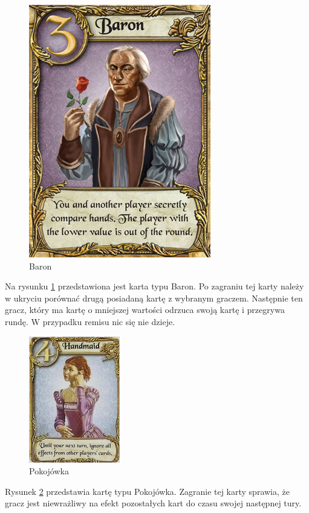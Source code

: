 \clearpage
\begin{figure}[h]
	\centering
	\includegraphics[scale=0.5]{Resources/Love_Letter_Card_Baron.png}
	\caption{Baron} \label{fig:Love_Letter_Card_Baron}
\end{figure}
Na rysunku \ref{fig:Love_Letter_Card_Baron} przedstawiona jest karta typu Baron. Po zagraniu tej karty należy w ukryciu porównać drugą posiadaną kartę z wybranym graczem. Następnie ten gracz, który ma kartę o mniejszej wartości odrzuca swoją kartę i przegrywa rundę. W przypadku remisu nic się nie dzieje.

\begin{figure}[h]
	\centering
	\includegraphics{Resources/Love_Letter_Card_Handmaid.png}
	\caption{Pokojówka} \label{fig:Love_Letter_Card_Handmaid}
\end{figure}
Rysunek \ref{fig:Love_Letter_Card_Handmaid} przedstawia kartę typu Pokojówka. Zagranie tej karty sprawia, że gracz jest niewrażliwy na efekt pozostałych kart do czasu swojej następnej tury.

